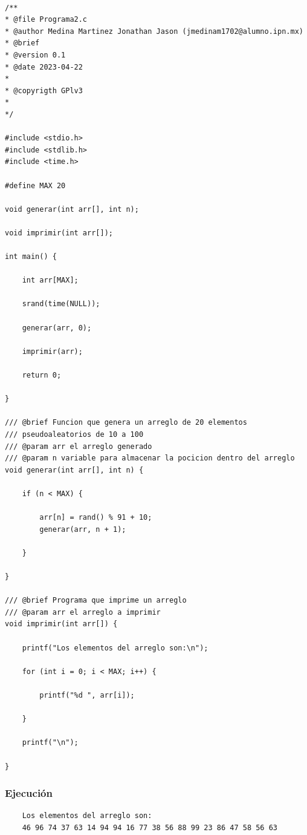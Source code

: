 \documentclass{article}
\begin{document}
	\begin{lstlisting}

/**
* @file Programa2.c
* @author Medina Martinez Jonathan Jason (jmedinam1702@alumno.ipn.mx)
* @brief 
* @version 0.1
* @date 2023-04-22
* 
* @copyrigth GPlv3
* 
*/

#include <stdio.h>
#include <stdlib.h>
#include <time.h>

#define MAX 20

void generar(int arr[], int n);

void imprimir(int arr[]);

int main() {
	
	int arr[MAX];
	
	srand(time(NULL));
	
	generar(arr, 0);
	
	imprimir(arr);
	
	return 0;
	
}

/// @brief Funcion que genera un arreglo de 20 elementos
/// pseudoaleatorios de 10 a 100
/// @param arr el arreglo generado
/// @param n variable para almacenar la pocicion dentro del arreglo
void generar(int arr[], int n) {
	
	if (n < MAX) {
		
		arr[n] = rand() % 91 + 10;
		generar(arr, n + 1);
		
	}
	
}

/// @brief Programa que imprime un arreglo
/// @param arr el arreglo a imprimir
void imprimir(int arr[]) {
	
	printf("Los elementos del arreglo son:\n");
	
	for (int i = 0; i < MAX; i++) {
		
		printf("%d ", arr[i]);
		
	}
	
	printf("\n");
	
}
	\end{lstlisting}
	
	\subsubsection{Ejecución}
	
	\begin{lstlisting}
	Los elementos del arreglo son:
	46 96 74 37 63 14 94 94 16 77 38 56 88 99 23 86 47 58 56 63 
	\end{lstlisting}
	
	\newpage
	
\end{document}

